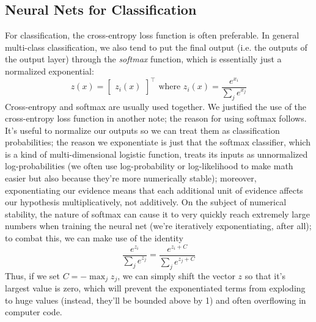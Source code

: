 \documentclass{article}
\begin{document}
\subsection{Neural Nets for Classification}
For classification, the cross-entropy loss function is often preferable. In general multi-class classification, we also tend to put the final output (i.e. the outputs of the output layer) through the \textit{softmax} function, which is essentially just a normalized exponential:
$$ z(x) = \begin{bmatrix} z_i(x) \end{bmatrix}^\intercal \text{ where } z_i(x) = \frac{e^{x_i}}{\sum_j e^{x_j}} $$
Cross-entropy and softmax are usually used together. We justified the use of the cross-entropy loss function in another note; the reason for using softmax follows. It's useful to normalize our outputs so we can treat them as classification probabilities; the reason we exponentiate is just that the softmax classifier, which is a kind of multi-dimensional logistic function, treats its inputs as unnormalized log-probabilities (we often use log-probability or log-likelihood to make math easier but also because they're more numerically stable); moreover, exponentiating our evidence means that each additional unit of evidence affects our hypothesis multiplicatively, not additively. On the subject of numerical stability, the nature of softmax can cause it to very quickly reach extremely large numbers when training the neural net (we're iteratively exponentiating, after all); to combat this, we can make use of the identity
$$ \frac{e^{z_i}}{\sum_j e^{z_j}} = \frac{e^{z_i + C}}{\sum_j e^{z_j + C}} $$
Thus, if we set $ C = - \max_j z_j $, we can simply shift the vector $ z $ so that it's largest value is zero, which will prevent the exponentiated terms from exploding to huge values (instead, they'll be bounded above by 1) and often overflowing in computer code.
\end{document}
